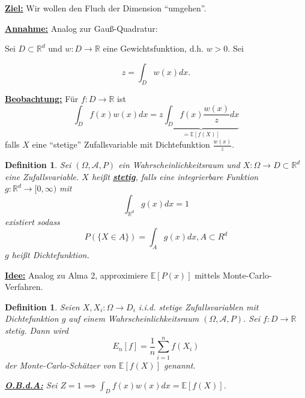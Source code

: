 \documentclass{book}
\newtheorem{definition}[algorithm]{Definition}
\def\R{\mathbb{R}}
\begin{document}
            \underline{\textbf{Ziel:}} Wir wollen den Fluch der Dimension ``umgehen''.

            \underline{\textbf{Annahme:}} Analog zur Gauß-Quadratur:

            Sei $D\subset\R^d$ und $w:D\to\R$ eine Gewichtsfunktion, d.h. $w>0$. Sei 

            $$z=\int_D w(x)dx.$$
            
            \underline{\textbf{Beobachtung:}} Für $f:D\to\R$ ist 
            \begin{equation}\label{g59}
                \int_D f(x)w(x)dx=z\underbrace{\int_D f(x)\frac{w(x)}{z}dx}_{=\mathbb{E}[f(X)]}
            \end{equation}
            falls $X$ eine ``stetige'' Zufallsvariable mit Dichtefunktion $\frac{w(x)}{z}$.
            
            \begin{definition}\label{d520}
                Sei $(\Omega,\mathcal{A},P)$ ein Wahrscheinlichkeitsraum und $X:\Omega\to D\subset\R^d$ eine Zufallsvariable. $X$ heißt \underline{\textbf{stetig}},
                falls eine integrierbare Funktion $g:\mathbb{R}^d\to[0,\infty)$ mit 
                \begin{equation*}
                    \int_{\R^d}g(x)dx=1
                \end{equation*}
                existiert sodass
                \begin{equation*}
                    P(\{X\in A\})=\int_A g(x)dx, A\subset R^d
                \end{equation*}
                $g$ heißt Dichtefunktion. 
            \end{definition}

            \underline{\textbf{Idee:}} Analog zu Alma 2, approximiere $\mathbb{E}[P(x)]$ mittels Monte-Carlo-Verfahren.

            \begin{definition}\label{d5.21}
                Seien $X,X_i:\Omega\to D_i$ i.i.d. stetige Zufallsvariablen mit Dichtefunktion $g$ auf einem Wahrscheinlichkeitsraum $(\Omega,\mathcal{A},P)$.
                Sei $f:D\to\R$ stetig. Dann wird 
                \begin{equation*}
                    E_n[f]=\frac{1}{n}\sum_{i=1}^n f(X_i)
                \end{equation*}
                der Monte-Carlo-Schätzer von $\mathbb{E}[f(X)]$ genannt. 

                \underline{\textbf{O.B.d.A:}} Sei $Z=1\implies \int_D f(x)w(x)dx=\mathbb{E}[f(X)]$.
                
            \end{definition}
\end{document}
